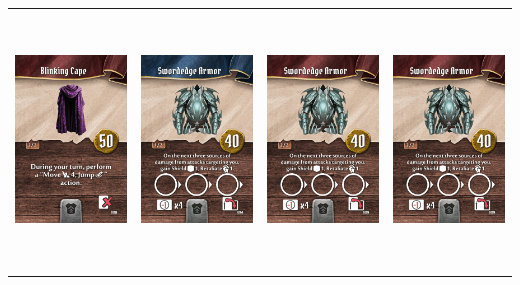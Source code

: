 \documentclass{minimal}
\begin{document}
{\begin{longtable}{llll}
\includegraphics[width=44mm,height=68mm]{./64-151/gh-073b-blinking-cape.png} &
\includegraphics[width=44mm,height=68mm]{./64-151/gh-074a-swordedge-armor.png} &
\includegraphics[width=44mm,height=68mm]{./64-151/gh-074b-swordedge-armor.png} &
\includegraphics[width=44mm,height=68mm]{./64-151/gh-074b-swordedge-armor.png}\\ 

\end{longtable}}
\end{document}
